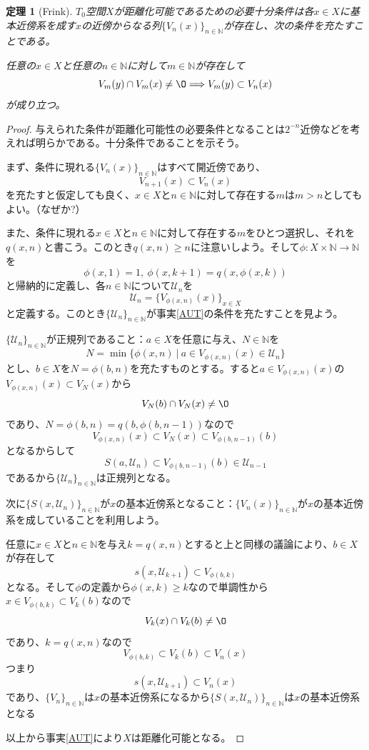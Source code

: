 \documentclass[leqno]{jsarticle}
\newtheorem{thm}{定理}
\newcommand{\To}{\Longrightarrow}
\newcommand{\nn}{\mathbb{N}}
\begin{document}
\begin{thm}[Frink]\label{frink}
$T_0$空間$X$が距離化可能であるための必要十分条件は各$x\in X$に基本近傍系を成す$x$の近傍からなる列$\{V_n(x)\}_{n\in \nn}$が存在し、次の条件を充たすことである。\par
任意の$x\in X$と任意の$n\in \nn$に対して$m\in \nn$が存在して
\[
V_m(y)\cap V_m(x)\neq\O\To V_m(y)\subset V_n(x)
\]
が成り立つ。
\end{thm}
\begin{proof}
与えられた条件が距離化可能性の必要条件となることは$2^{-n}$近傍などを考えれば明らかである。十分条件であることを示そう。\par
まず、条件に現れる$\{V_n(x)\}_{n\in \nn}$はすべて開近傍であり、
\[
V_{n+1}(x)\subset V_n(x)
\]
を充たすと仮定しても良く、$x\in X$と$n\in \nn$に対して存在する$m$は$m>n$としてもよい。（なぜか?）\par
また、条件に現れる$x\in X$と$n\in \nn$に対して存在する$m$をひとつ選択し、それを$q(x,n)$と書こう。このとき$q(x,n)\ge n$に注意いしよう。そして$\phi:X\times \nn\to \nn$を
\[
\phi(x,1)=1,\ \phi(x,k+1)=q(x,\phi(x,k))
\]
と帰納的に定義し、各$n\in \nn$について$\mathcal{U}_n$を
\[
\mathcal{U}_n=\{V_{\phi(x,n)}(x)\}_{x\in X}
\]
と定義する。このとき$\{\mathcal{U}_n\}_{n\in \nn}$が事実\ref{AUT}の条件を充たすことを見よう。
\par
$\{\mathcal{U}_n\}_{n\in \nn}$が正規列であること：$a\in X$を任意に与え、$N\in \nn$を
\[
N=\min\{\phi(x,n)\ |\ a\in V_{\phi(x,n)}(x)\in \mathcal{U}_n\}
\]
とし、$b\in X$を$N=\phi(b,n)$を充たすものとする。すると$a\in V_{\phi(x,n)}(x)$の$V_{\phi(x,n)}(x)\subset V_N(x)$から
\[
V_N(b)\cap V_N(x)\neq\O
\]
であり、$N=\phi(b,n)=q(b,\phi(b,n-1))$なので
\[
V_{\phi(x,n)}(x)\subset V_N(x)\subset V_{\phi(b,n-1)}(b)
\]
となるからして
\[
S(a,\mathcal{U}_n)\subset V_{\phi(b,n-1)}(b)\in \mathcal{U}_{n-1}
\]
であるから$\{\mathcal{U}_n\}_{n\in \nn}$は正規列となる。\par
次に$\{S(x,\mathcal{U}_n)\}_{n\in \nn}$が$x$の基本近傍系となること：$\{V_n(x)\}_{n\in \nn}$が$x$の基本近傍系を成していることを利用しよう。\par
任意に$x\in X$と$n\in \nn$を与え$k=q(x,n)$とすると上と同様の議論により、$b\in X$が存在して
\[
s(x,\mathcal{U}_{k+1})\subset V_{\phi(b,k)}
\]
となる。そして$\phi$の定義から$\phi(x,k)\ge k$なので単調性から
$x\in V_{\phi(b,k)}\subset V_k(b)$なので
\[
V_k(x)\cap V_k(b)\neq\O
\]
であり、$k=q(x,n)$なので
\[
V_{\phi(b,k)}\subset V_k(b)\subset V_n(x)
\]
つまり
\[
s(x,\mathcal{U}_{k+1})\subset V_n(x)
\]
であり、$\{V_n\}_{n\in \nn}$は$x$の基本近傍系になるから$\{S(x,\mathcal{U}_n)\}_{n\in \nn}$は$x$の基本近傍系となる\par
以上から事実\ref{AUT}により$X$は距離化可能となる。
\end{proof}
\end{document}
